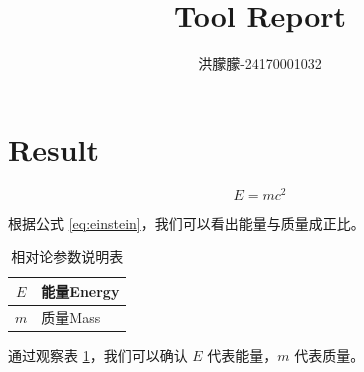 \documentclass{article}
\begin{document}
\title{Tool Report}
\author{洪朦朦-24170001032}
\maketitle
\section{Result}

\begin{equation}
    E = mc^2
    \label{eq:einstein}
\end{equation}

根据公式 \ref{eq:einstein}，我们可以看出能量与质量成正比。\\

\begin{table}[htbp]
    \centering    
    \caption{相对论参数说明表}
    \label{tab:params}    
    \begin{tabular}{|c|l|} 
        \hline
        $E$ & 能量Energy\\%
        \hline
        $m$ & 质量Mass\\%
        \hline
    \end{tabular}
\end{table}

通过观察表 \ref{tab:params}，我们可以确认 $E$ 代表能量，$m$ 代表质量。
\end{document}
